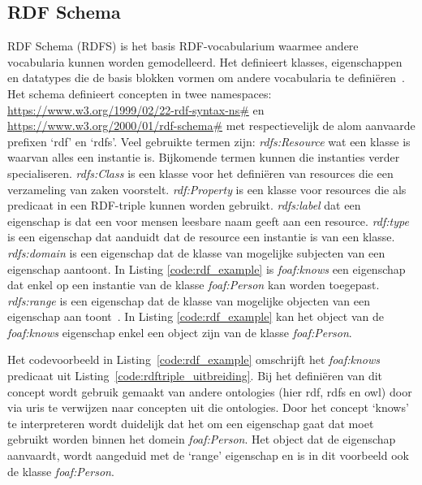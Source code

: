 \subsection{RDF Schema}
RDF Schema (RDFS) is het basis RDF-vocabularium waarmee andere vocabularia kunnen worden gemodelleerd. Het definieert klasses, eigenschappen en datatypes die de basis blokken vormen om andere vocabularia te definiëren~\cite{verborgh_webfundamental}. Het schema definieert concepten in twee namespaces: \url{https://www.w3.org/1999/02/22-rdf-syntax-ns#} en \url{https://www.w3.org/2000/01/rdf-schema#} met respectievelijk de alom aanvaarde prefixen `rdf' en `rdfs'.
Veel gebruikte termen zijn:
\textit{rdfs:Resource} wat een klasse is waarvan alles een instantie is. Bijkomende termen kunnen die instanties verder specialiseren.
\textit{rdfs:Class} is een klasse voor het definiëren van resources die een verzameling van zaken voorstelt.
\textit{rdf:Property} is een klasse voor resources die als predicaat in een RDF-triple kunnen worden gebruikt.
\textit{rdfs:label} dat een eigenschap is dat een voor mensen leesbare naam geeft aan een resource.
\textit{rdf:type} is een eigenschap dat aanduidt dat de resource een instantie is van een klasse.
\textit{rdfs:domain} is een eigenschap dat de klasse van mogelijke subjecten van een eigenschap aantoont. In Listing \ref{code:rdf_example} is \textit{foaf:knows} een eigenschap dat enkel op een instantie van de klasse \textit{foaf:Person} kan worden toegepast.
\textit{rdfs:range} is een eigenschap dat de klasse van mogelijke objecten van een eigenschap aan toont~\cite{verborgh_webfundamental}. In Listing \ref{code:rdf_example} kan het object van de \textit{foaf:knows} eigenschap enkel een object zijn van de klasse \textit{foaf:Person}.

Het codevoorbeeld in Listing~\ref{code:rdf_example} omschrijft het \textit{foaf:knows} predicaat uit Listing~\ref{code:rdftriple_uitbreiding}. Bij het definiëren van dit concept wordt gebruik gemaakt van andere \glspl{ontologie} (hier rdf, rdfs en owl) door via \acrshort{uri}s te verwijzen naar concepten uit die \glspl{ontologie}. Door het concept `knows' te interpreteren wordt duidelijk dat het om een eigenschap gaat dat moet gebruikt worden binnen het domein \textit{foaf:Person}. Het object dat de eigenschap aanvaardt, wordt aangeduid met de `range' eigenschap en is in dit voorbeeld ook de klasse \textit{foaf:Person}.

